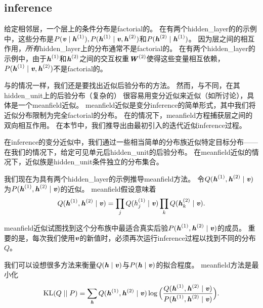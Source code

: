 \subsection{\gls{inference}}
\label{sec:dbm_mean_field_inference}
给定相邻层，一个层上的条件分布是\gls{factorial}的。
在有两个\gls{hidden_layer}的的示例中，这些分布是$P(\Vv  \mid  \Vh^{(1)}), P(\Vh^{(1)}  \mid  \Vv, \Vh^{(2)})$和$P(\Vh^{(2)}  \mid  \Vh^{(1)})$。
因为层之间的相互作用，\emph{所有}\gls{hidden_layer}上的分布通常不是\gls{factorial}的。
在有两个\gls{hidden_layer}的示例中，由于$\Vh^{(1)}$和$\Vh^{(2)}$之间的交互权重$\MW^{(2)}$使得这些变量相互依赖， $ P(\Vh^{(1)}  \mid  \Vv, \Vh^{(2)})$不是\gls{factorial}的。


与的情况一样，我们还是要找出近似后验分布的方法。
然而，与不同，在其\gls{hidden_unit}上的后验分布（复杂的） 很容易用变分近似来近似（如所讨论），具体是一个\gls{meanfield}近似。
\gls{meanfield}近似是变分\gls{inference}的简单形式，其中我们将近似分布限制为完全\gls{factorial}的分布。
在的情况下，\gls{meanfield}方程捕获层之间的双向相互作用。
在本节中，我们推导出由\cite{SalHinton09}最初引入的迭代近似\gls{inference}过程。


在\gls{inference}的变分近似中，我们通过一些相当简单的分布族近似特定目标分布——在我们的情况下，给定可见单元后\gls{hidden_unit}的后验分布。
在\gls{meanfield}近似的情况下，近似族是\gls{hidden_unit}条件独立的分布集合。


我们现在为具有两个\gls{hidden_layer}的示例推导\gls{meanfield}方法。
令$Q(\Vh^{(1)}, \Vh^{(2)}  \mid  \Vv)$为$P(\Vh^{(1)}, \Vh^{(2)}  \mid  \Vv)$的近似。
\gls{meanfield}假设意味着
\begin{align}
 Q(\Vh^{(1)}, \Vh^{(2)}  \mid  \Vv) = \prod_j Q(h_j^{(1)} \mid  \Vv) \prod_k Q(\Vh_k^{(2)}  \mid  \Vv).
\end{align}

\gls{meanfield}近似试图找到这个分布族中最适合真实后验$P(\Vh^{(1)}, \Vh^{(2)}  \mid  \Vv)$的成员。
重要的是，每次我们使用$\Vv$的新值时，必须再次运行\gls{inference}过程以找到不同的分布$Q$。


我们可以设想很多方法来衡量$Q(\Vh  \mid  \Vv)$与$P(\Vh  \mid  \Vv)$的拟合程度。
\gls{meanfield}方法是最小化
\begin{align}
 \text{KL}(Q \mid  \mid P) = \sum_{\Vh} Q(\Vh^{(1)}, \Vh^{(2)}  \mid  \Vv) 
 \log \Big( \frac{Q(\Vh^{(1)}, \Vh^{(2)}  \mid  \Vv)}{P(\Vh^{(1)}, \Vh^{(2)}  \mid  \Vv)} \Big).
\end{align}

